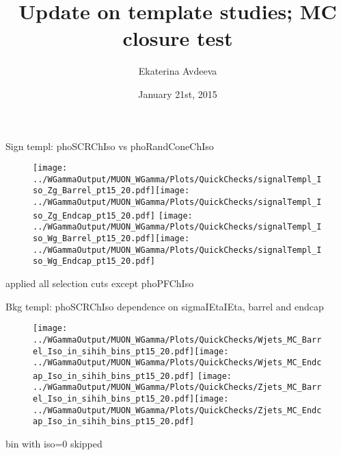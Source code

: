 \documentclass{beamer}
\title{Update on template studies; MC closure test}
\author{Ekaterina Avdeeva}
\institute{University of Nebraska - Lincoln}
\date{January 21st, 2015}
\begin{document}
\begin{frame}
\titlepage
\end{frame}



\begin{frame}{Sign templ: phoSCRChIso vs phoRandConeChIso}
  \begin{figure}
    \centering
    \texttt{[image: ../WGammaOutput/MUON\_WGamma/Plots/QuickChecks/signalTempl\_Iso\_Zg\_Barrel\_pt15\_20.pdf]}\texttt{[image: ../WGammaOutput/MUON\_WGamma/Plots/QuickChecks/signalTempl\_Iso\_Zg\_Endcap\_pt15\_20.pdf]}
    \texttt{[image: ../WGammaOutput/MUON\_WGamma/Plots/QuickChecks/signalTempl\_Iso\_Wg\_Barrel\_pt15\_20.pdf]}\texttt{[image: ../WGammaOutput/MUON\_WGamma/Plots/QuickChecks/signalTempl\_Iso\_Wg\_Endcap\_pt15\_20.pdf]}
  \end{figure}
  \scriptsize applied all selection cuts except phoPFChIso
\end{frame}

\begin{frame}{Bkg templ: phoSCRChIso dependence on sigmaIEtaIEta, barrel and endcap}
  \begin{figure}
    \centering
    \texttt{[image: ../WGammaOutput/MUON\_WGamma/Plots/QuickChecks/Wjets\_MC\_Barrel\_Iso\_in\_sihih\_bins\_pt15\_20.pdf]}\texttt{[image: ../WGammaOutput/MUON\_WGamma/Plots/QuickChecks/Wjets\_MC\_Endcap\_Iso\_in\_sihih\_bins\_pt15\_20.pdf]}
    \texttt{[image: ../WGammaOutput/MUON\_WGamma/Plots/QuickChecks/Zjets\_MC\_Barrel\_Iso\_in\_sihih\_bins\_pt15\_20.pdf]}\texttt{[image: ../WGammaOutput/MUON\_WGamma/Plots/QuickChecks/Zjets\_MC\_Endcap\_Iso\_in\_sihih\_bins\_pt15\_20.pdf]}
  \end{figure}
  \scriptsize bin with iso=0 skipped
\end{frame}
\end{document}

